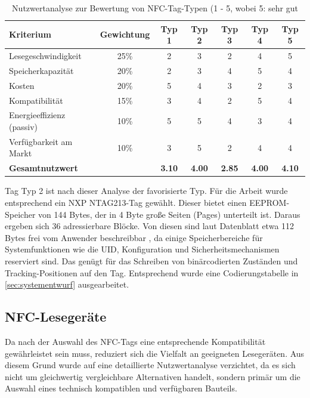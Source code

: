 \begin{table}[H]
	\centering
	\caption{Nutzwertanalyse zur Bewertung von NFC-Tag-Typen (1 - 5, wobei 5: sehr gut}
	\label{tab:nutzwertanalyse-nfc-tags}
	\begin{tabular}{|l|c|c|c|c|c|c|}
		\hline
		\textbf{Kriterium} & \textbf{Gewichtung} & \textbf{Typ 1} & \textbf{Typ 2} & \textbf{Typ 3} & \textbf{Typ 4} & \textbf{Typ 5} \\ \hline
		Lesegeschwindigkeit         & 25\% & 2 & 3 & 2 & 4 & 5 \\ \hline
		Speicherkapazität           & 20\% & 2 & 3 & 4 & 5 & 4 \\ \hline
		Kosten                      & 20\% & 5 & 4 & 3 & 2 & 3 \\ \hline
		Kompatibilität              & 15\% & 3 & 4 & 2 & 5 & 4 \\ \hline
		Energieeffizienz (passiv)   & 10\% & 5 & 5 & 4 & 3 & 4 \\ \hline
		Verfügbarkeit am Markt      & 10\% & 3 & 5 & 2 & 4 & 4 \\ \hline
		\textbf{Gesamtnutzwert}     &      & \textbf{3.10} & \textbf{4.00} & \textbf{2.85} & \textbf{4.00} & \textbf{4.10} \\ \hline
	\end{tabular}
\end{table}

Tag Typ 2 ist nach dieser Analyse der favorisierte Typ. Für die Arbeit wurde entsprechend ein NXP NTAG213-Tag gewählt. Dieser bietet einen EEPROM-Speicher von 144 Bytes, der in 4 Byte große Seiten (Pages) unterteilt ist. Daraus ergeben sich 36 adressierbare Blöcke. Von diesen sind laut Datenblatt etwa 112 Bytes frei vom Anwender beschreibbar \cite{nxp_ntag213f_datasheet}, da einige Speicherbereiche für Systemfunktionen wie die UID, Konfiguration und Sicherheitsmechanismen reserviert sind. Das genügt für das Schreiben von binärcodierten Zuständen und Tracking-Positionen auf den Tag. Entsprechend wurde eine Codierungstabelle in \autoref{sec:systementwurf} ausgearbeitet. 

\subsection{NFC-Lesegeräte}

Da nach der Auswahl des NFC-Tags eine entsprechende Kompatibilität gewährleistet sein muss, reduziert sich die Vielfalt an geeigneten Lesegeräten. Aus diesem Grund wurde auf eine detaillierte Nutzwertanalyse verzichtet, da es sich nicht um gleichwertig vergleichbare Alternativen handelt, sondern primär um die Auswahl eines technisch kompatiblen und verfügbaren Bauteils.

